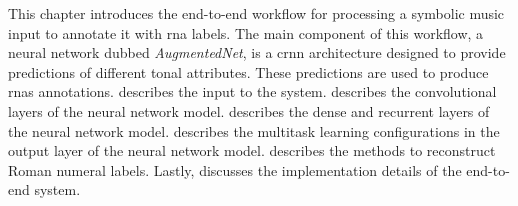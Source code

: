 

This chapter introduces the end-to-end workflow for
processing a symbolic music input to annotate it with
\gls{rna} labels. The main component of this workflow, a
neural network dubbed \emph{AugmentedNet}, is a \gls{crnn}
architecture designed to provide predictions of different
tonal attributes. These predictions are used to produce
\glspl{rna} annotations.  describes the input
to the system. 
describes the convolutional layers of the neural network
model.  describes the dense
and recurrent layers of the neural network model.
 describes the
multitask learning configurations in the output layer of the
neural network model. 
describes the methods to reconstruct Roman numeral labels.
Lastly,  discusses the implementation
details of the end-to-end system.
